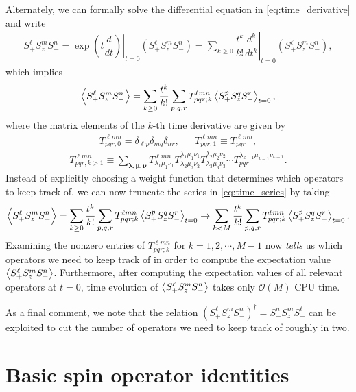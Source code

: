 \documentclass[aps,notitlepage,nofootinbib,11pt]{revtex4-1}
\newcommand{\f}[2]{\dfrac{#1}{#2}} %
\newcommand{\p}[1]{\left(#1\right)} %
\renewcommand{\v}{\bm} %
\newcommand{\bk}{\Braket} %
\renewcommand{\O}{\mathcal{O}}
\newcommand{\1}{\mathds{1}}
\begin{document}
Alternately, we can formally solve the differential equation in
\eqref{eq:time_derivative} and write
\begin{align}
  S_+^\ell S_z^m S_-^n
  = \left.\exp\p{t \f{d}{dt}}\right|_{t=0} \p{S_+^\ell S_z^m S_-^n}
  = \sum_{k\ge0} \f{t^k}{k!}
  \left.\f{d^k}{dt^k}\right|_{t=0} \p{S_+^\ell S_z^m S_-^n},
\end{align}
which implies
\begin{align}
  \bk{S_+^\ell S_z^m S_-^n}
  = \sum_{k\ge0} \f{t^k}{k!}
  \sum_{p,q,r} T^{\ell m n}_{pqr;k} \bk{S_+^p S_z^q S_-^r}_{t=0},
  \label{eq:time_series}
\end{align}
where the matrix elements of the $k$-th time derivative are given by
\begin{align}
  T^{\ell m n}_{pqr;0}=\delta_{\ell p}\delta_{mq}\delta_{nr},
  &&
  T^{\ell m n}_{pqr;1}\equiv T^{\ell m n}_{pqr},
\end{align}
\begin{align}
  T^{\ell mn}_{pqr;k>1}
  \equiv \sum_{\v\lambda,\v\mu,\v\nu}
  T^{\ell mn}_{\lambda_1 \mu_1 \nu_1}
  T^{\lambda_1 \mu_1 \nu_1}_{\lambda_2 \mu_2 \nu_2}
  T^{\lambda_2 \mu_2 \nu_2}_{\lambda_3 \mu_3 \nu_3}
  \cdots T^{\lambda_{k-1} \mu_{k-1} \nu_{k-1}}_{pqr}.
\end{align}
Instead of explicitly choosing a weight function that determines which
operators to keep track of, we can now truncate the series in
\eqref{eq:time_series} by taking
\begin{align}
  \bk{S_+^\ell S_z^m S_-^n}
  = \sum_{k\ge0} \f{t^k}{k!}
  \sum_{p,q,r} T^{\ell m n}_{pqr;k} \bk{S_+^p S_z^q S_-^r}_{t=0}
  \to \sum_{k<M} \f{t^k}{k!}
  \sum_{p,q,r} T^{\ell m n}_{pqr;k} \bk{S_+^p S_z^q S_-^r}_{t=0}.
\end{align}
Examining the nonzero entries of $T^{\ell mn}_{pqr;k}$ for
$k=1,2,\cdots,M-1$ now {\it tells} us which operators we need to keep
track of in order to compute the expectation value
$\bk{S_+^\ell S_z^m S_-^n}$.  Furthermore, after computing the
expectation values of all relevant operators at $t=0$, time evolution
of $\bk{S_+^\ell S_z^m S_-^n}$ takes only $\O\p{M}$ CPU time.

As a final comment, we note that the relation
$\p{S_+^\ell S_z^m S_-^n}^\dag=S_+^n S_z^m S_-^\ell$ can be exploited
to cut the number of operators we need to keep track of roughly in
two.




\newpage
\appendix

\section{Basic spin operator identities}
\label{sec:identities}
\end{document}
